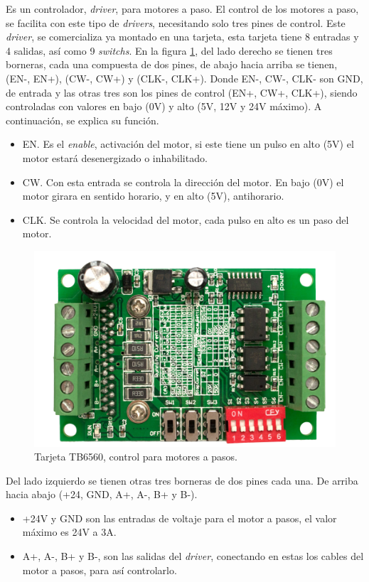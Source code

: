 Es un controlador, \textit{driver}, para motores a paso. El control de los motores a paso, se facilita con este tipo de \textit{drivers}, necesitando solo tres pines de control. Este \textit{driver}, se comercializa ya montado en una tarjeta, esta tarjeta tiene 8 entradas y 4 salidas, así como 9 \textit{switchs}. En la figura \ref{fig:tb6560}, del lado derecho se tienen tres borneras, cada una compuesta de dos pines, de abajo hacia arriba se tienen, (EN-, EN+), (CW-, CW+) y (CLK-, CLK+). Donde EN-, CW-, CLK- son GND, de entrada y las otras tres son los pines de control (EN+, CW+, CLK+), siendo controladas con valores en bajo (0V) y alto (5V, 12V y 24V máximo). A continuación, se explica su función.

\begin{itemize}
	\item EN. Es el \textit{enable}, activación del motor, si este tiene un pulso en alto (5V) el motor estará desenergizado o inhabilitado.
	\item CW. Con esta entrada se controla la dirección del motor. En bajo (0V) el motor girara en sentido horario, y en alto (5V), antihorario.
	\item CLK. Se controla la velocidad del motor, cada pulso en alto es un paso del motor.
\end{itemize}

\begin{figure}[h]
	\centering
	\includegraphics[width=0.7\linewidth]{Imagenes/2/TB6560a}
	\caption{Tarjeta TB6560, control para motores a pasos. \cite{TB6560}}
	\label{fig:tb6560}
\end{figure}
Del lado izquierdo se tienen otras tres borneras de dos pines cada una. De arriba hacia abajo (+24, GND, A+, A-, B+ y B-). 
\begin{itemize}
	\item +24V y GND son las entradas de voltaje para el motor a pasos, el valor máximo es 24V a 3A. 
	\item A+, A-, B+ y B-, son las salidas del \textit{driver}, conectando en estas los cables del motor a pasos, para así controlarlo.
\end{itemize} 

